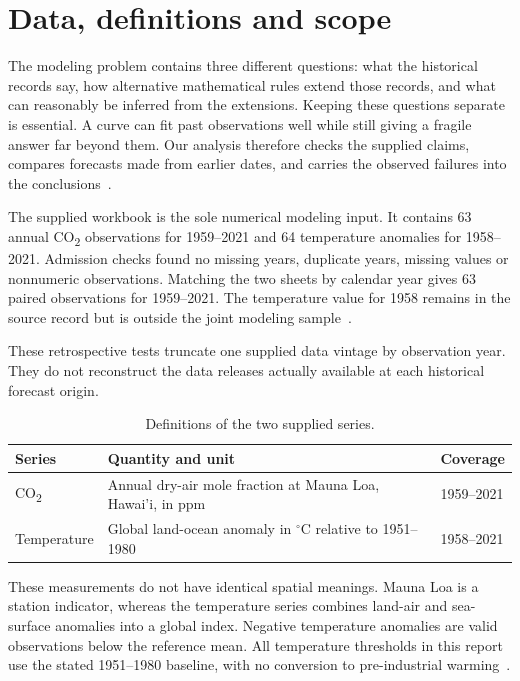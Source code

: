 \documentclass[11pt,a4paper]{article}
\newcommand{\p}[2]{#2\par}
\newcommand{\txt}[2]{#2}
\newcommand{\CO}{CO\textsubscript{2}}
\newcommand{\degC}{\ensuremath{{}^{\circ}\mathrm{C}}}
\begin{document}
\section{Data, definitions and scope}\label{sec:data}
\p{DAT01}{The modeling problem contains three different questions: what the historical records say, how alternative mathematical rules extend those records, and what can reasonably be inferred from the extensions. Keeping these questions separate is essential. A curve can fit past observations well while still giving a fragile answer far beyond them. Our analysis therefore checks the supplied claims, compares forecasts made from earlier dates, and carries the observed failures into the conclusions~\cite{problem}.}
\p{DAT02}{The supplied workbook is the sole numerical modeling input. It contains 63 annual \CO{} observations for 1959--2021 and 64 temperature anomalies for 1958--2021. Admission checks found no missing years, duplicate years, missing values or nonnumeric observations. Matching the two sheets by calendar year gives 63 paired observations for 1959--2021. The temperature value for 1958 remains in the source record but is outside the joint modeling sample~\cite{workbook}.}
\p{DAT07}{These retrospective tests truncate one supplied data vintage by observation year. They do not reconstruct the data releases actually available at each historical forecast origin.}
\begin{table}[H]\centering\small
\caption{\txt{TC01}{Definitions of the two supplied series.}}\label{tab:data}
\begin{tabular}{p{.17\linewidth}p{.58\linewidth}p{.17\linewidth}}\toprule
Series & Quantity and unit & Coverage\\\midrule
\CO{} & Annual dry-air mole fraction at Mauna Loa, Hawai'i, in ppm & 1959--2021\\
Temperature & Global land-ocean anomaly in \degC{} relative to 1951--1980 & 1958--2021\\\bottomrule
\end{tabular}
\end{table}
\p{DAT03}{These measurements do not have identical spatial meanings. Mauna Loa is a station indicator, whereas the temperature series combines land-air and sea-surface anomalies into a global index. Negative temperature anomalies are valid observations below the reference mean. All temperature thresholds in this report use the stated 1951--1980 baseline, with no conversion to pre-industrial warming~\cite{noaa-data,nasa}.}
\end{document}
